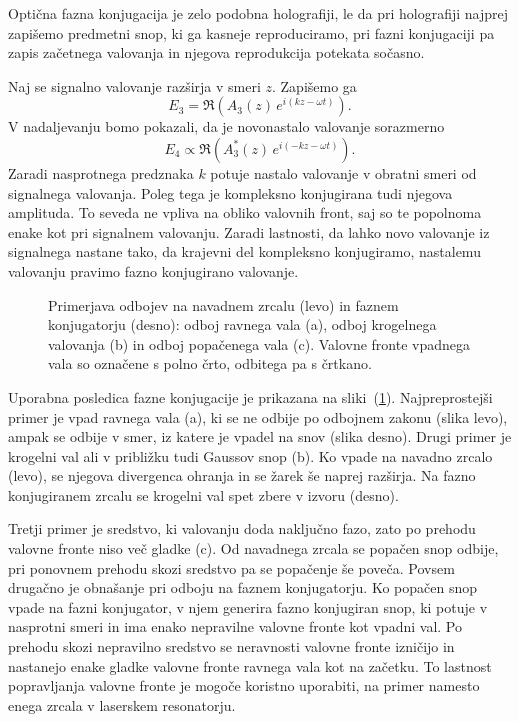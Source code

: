 \begin{remark}Optična fazna konjugacija je zelo podobna holografiji, 
le da pri holografiji najprej zapišemo predmetni snop, ki ga kasneje reproduciramo, 
pri fazni konjugaciji pa zapis začetnega valovanja in njegova reprodukcija 
potekata sočasno. 
\end{remark}
Naj se signalno valovanje razširja v smeri $z$. Zapišemo ga  
\begin{equation}
E_{3}=\mathfrak{\Re}\left(A_3\left(z\right)\, e^{i\left(kz-\omega t\right)}\right).
\label{8.97}
\end{equation}
V nadaljevanju bomo pokazali, da je novonastalo valovanje sorazmerno
\begin{equation}
E_{4} \propto \mathfrak{\Re}\left(A_3^{*}\left(z\right)\, e^{i\left(-kz-\omega t\right)}\right).
\label{8.98}
\end{equation}
Zaradi nasprotnega predznaka $k$ potuje nastalo valovanje v obratni smeri od signalnega
valovanja. Poleg tega je kompleksno konjugirana tudi njegova amplituda. To seveda
ne vpliva na obliko valovnih front, saj so te popolnoma enake kot pri signalnem
valovanju. Zaradi lastnosti, da lahko novo valovanje iz signalnega nastane tako,
da krajevni del kompleksno konjugiramo, nastalemu valovanju pravimo fazno
konjugirano valovanje.
\begin{figure}[h!]
\centering
\def\svgwidth{80truemm} 

\caption{Primerjava odbojev na navadnem zrcalu (levo) in faznem konjugatorju (desno): odboj ravnega
vala (a), odboj krogelnega valovanja (b) in odboj popačenega vala (c). Valovne fronte 
vpadnega vala so označene s polno črto, odbitega pa s črtkano.}
\label{08_OPC2}
\end{figure}

Uporabna posledica fazne konjugacije je prikazana na sliki~(\ref{08_OPC2}).
Najpreprostejši primer je vpad ravnega vala (a), ki se ne odbije po 
odbojnem zakonu (slika levo), ampak se odbije v smer, iz katere 
je vpadel na snov (slika desno). Drugi primer je krogelni val 
ali v približku tudi Gaussov snop (b). Ko vpade na navadno zrcalo (levo), se njegova divergenca
ohranja in se žarek še naprej razširja. Na fazno konjugiranem zrcalu se krogelni val spet
zbere v izvoru (desno). 

Tretji primer je sredstvo, ki valovanju doda naključno
fazo, zato po prehodu valovne fronte niso več gladke (c). Od navadnega zrcala
se popačen snop odbije, pri ponovnem prehodu skozi sredstvo pa se popačenje
še poveča. Povsem drugačno je obnašanje pri odboju na faznem konjugatorju. 
Ko popačen snop vpade na fazni konjugator, v njem generira fazno konjugiran snop, 
ki potuje v nasprotni smeri in ima enako nepravilne valovne fronte kot vpadni val. Po prehodu
skozi nepravilno sredstvo se neravnosti valovne fronte izničijo
in nastanejo enake gladke valovne fronte ravnega vala kot na začetku. 
To lastnost popravljanja valovne fronte je mogoče 
koristno uporabiti, na primer namesto enega zrcala v laserskem resonatorju.

